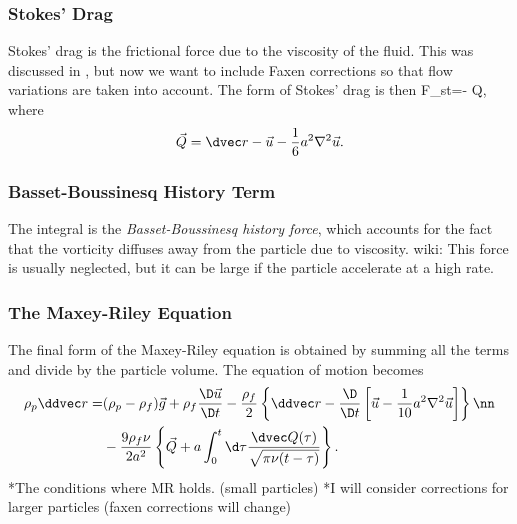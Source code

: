 \subsubsection{Stokes' Drag}

Stokes' drag is the frictional force due to the viscosity of the fluid. This was discussed in , but now we want to include Faxen corrections so that flow variations are taken into account. The form of Stokes' drag is then
\beq
F_{\rm  st}=- \vec Q,
\nn
\eeq
where
\begin{equation}
\vec Q = \dvec r - \vec u-\frac{1}{6}a^2\nabla^2\vec u.
\end{equation}

\subsubsection{Basset-Boussinesq History Term}

The integral is the \emph{Basset-Boussinesq history force}, which accounts for the fact that the vorticity diffuses away from the particle due to viscosity. wiki: This force is usually neglected, but it can be large if the particle accelerate at a high rate. 


\subsubsection{The Maxey-Riley Equation}
The final form of the Maxey-Riley equation is obtained by summing all the terms and divide by the particle volume. The equation of motion becomes
\begin{align}
\rho_p \ddvec r = &(\rho _p - \rho _f) \vec g + \rho _f 
\frac{\D \vec u}{\D t} - \frac{\rho_f}{2}\left\{\ddvec r - 
\frac{\D}{\D t}\left[\vec u - \frac{1}{10}a^2\nabla^2 \vec u \right] 
\right\} \nn \\ &- \frac{9 \rho _f \nu}{2 a^2}\left\{\vec Q + 
a \int_0^t \d \tau \frac{\dvec Q (\tau )}{\sqrt{\pi \nu (t-\tau )}}
\right\}.
\end{align}
*The conditions where MR holds. (small particles)
*I will consider corrections for larger particles (faxen corrections will change)
